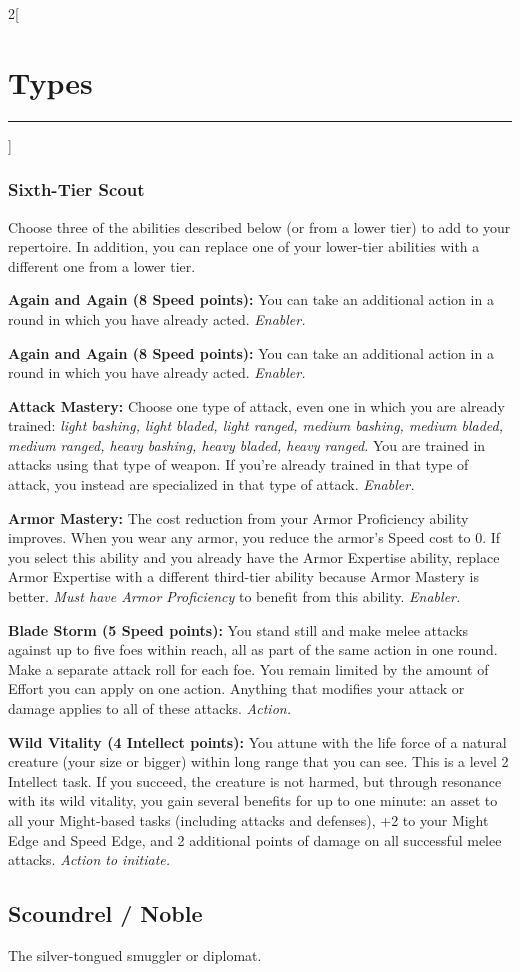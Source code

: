 \documentclass[a4paper,10pt,final]{book}
\newcommand{\HRule}{\rule{\linewidth}{0.5mm}} %
\newcommand{\newSection}[1]{\section*{#1} \addcontentsline{toc}{section}{#1} \label{sec:#1} \HRule}
\newcommand{\itemAbility}[2]{\textcolor{25gray}{\textbullet\textbf{ #1:}} {#2}\par}
\newcommand{\enabler}{\textit{ Enabler.}}
\newcommand{\action}{\textit{ Action.}}
\newcommand{\actionInit}{\textit{ Action to initiate.}}
\newenvironment{docsection}[1]
{
  \begin{multicols*}{2}[\newSection{#1}]
}
{
  \end{multicols*}
  \newpage
}
\begin{document}
\begin{docsection}{Types}
\subsubsection*{Sixth-Tier Scout}
\label{subsub:scoutSixthTier}
Choose three of the abilities described
below (or from a lower tier) to add to your
repertoire. In addition, you can replace one
of your lower-tier abilities with a different
one from a lower tier.\par
\itemAbility{Again and Again (8 Speed points)}{You
can take an additional action in a round in
which you have already acted.\enabler}
\itemAbility{Again and Again (8 Speed points)}{You
can take an additional action in a round in
which you have already acted.\enabler}
\itemAbility{Attack Mastery}{Choose one
type of attack, even one in which you are
already trained: \textit{light bashing, light bladed,
light ranged, medium bashing, medium
bladed, medium ranged, heavy bashing,
heavy bladed, heavy ranged.} You are
trained in attacks using that type of weapon.
If you’re already trained in that type of
attack, you instead are specialized in that
type of attack.\enabler}
\itemAbility{Armor Mastery}{The cost reduction
from your Armor Proficiency ability
improves. When you wear any armor, you
reduce the armor’s Speed cost to 0. If you
select this ability and you already have the
Armor Expertise ability, replace
Armor Expertise with a different
third-tier ability because Armor Mastery is better.
\textit{Must have Armor Proficiency} to benefit from this ability.\enabler}
\itemAbility{Blade Storm (5 Speed points)}{You stand
still and make melee attacks against up
to five foes within reach, all as part of the
same action in one round. Make a separate
attack roll for each foe. You remain limited
by the amount of Effort you can apply on
one action. Anything that modifies your
attack or damage applies to all of these
attacks.\action}
\itemAbility{Wild Vitality (4 Intellect points)}{You attune
with the life force of a natural creature (your
size or bigger) within long range that you
can see. This is a level 2 Intellect task. If you
succeed, the creature is not harmed, but
through resonance with its wild vitality, you
gain several benefits for up to one minute: an
asset to all your Might-based tasks (including
attacks and defenses), +2 to your Might Edge
and Speed Edge, and 2 additional points
of damage on all successful melee attacks.\actionInit}


\subsection*{Scoundrel / Noble} %
\label{sub:scoundrel_noble}

The silver-tongued smuggler or diplomat.


\end{docsection}
\end{document}
